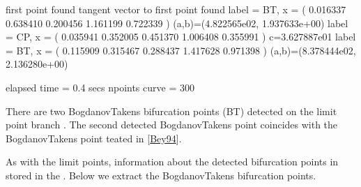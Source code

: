 \documentclass[letterpaper,10pt,english]{jupyterBook}
\begin{document}
\begin{sphinxVerbatim}[commandchars=\\\{\}]
first point found
tangent vector to first point found
label = BT, x = ( 0.016337 0.638410 0.200456 1.161199 0.722339 )
(a,b)=(\PYGZhy{}4.822565e\PYGZhy{}02, \PYGZhy{}1.937633e+00)
label = CP, x = ( 0.035941 0.352005 0.451370 1.006408 0.355991 )
c=3.627887e\PYGZhy{}01
label = BT, x = ( 0.115909 0.315467 0.288437 1.417628 0.971398 )
(a,b)=(\PYGZhy{}8.378444e\PYGZhy{}02, \PYGZhy{}2.136280e+00)

elapsed time  = 0.4 secs
npoints curve = 300
\end{sphinxVerbatim}

\sphinxAtStartPar
There are two Bogdanov\sphinxhyphen{}Takens bifurcation points (BT) detected on the limit
point branch . The second detected Bogdanov\sphinxhyphen{}Takens point coincides with
the Bogdanov\sphinxhyphen{}Takens point teated in {[}\hyperlink{cite.references:id9}{Bey94}{]}.

\sphinxAtStartPar
As with the limit points, information about the detected bifurcation points in
stored in the  . Below we extract the
Bogdanov\sphinxhyphen{}Takens bifurcation points.

\begin{sphinxVerbatim}[commandchars=\\\{\}]
\end{sphinxVerbatim}
\end{document}
